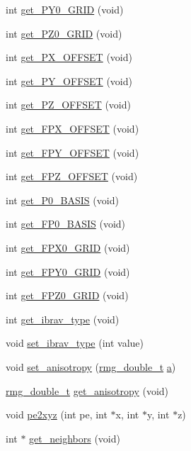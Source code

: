 \begin{DoxyCompactItemize}
\item 
int \hyperlink{class_base_grid_a1a061edfebb8264e0b182df5071f3ba0}{get\-\_\-\-P\-Y0\-\_\-\-G\-R\-I\-D} (void)
\item 
int \hyperlink{class_base_grid_a400c127433c364733a592b50bf8fff18}{get\-\_\-\-P\-Z0\-\_\-\-G\-R\-I\-D} (void)
\item 
int \hyperlink{class_base_grid_a80a0e717528a69f6df70b0fd17015931}{get\-\_\-\-P\-X\-\_\-\-O\-F\-F\-S\-E\-T} (void)
\item 
int \hyperlink{class_base_grid_a04caa97dccc0d4263602e672148eb68b}{get\-\_\-\-P\-Y\-\_\-\-O\-F\-F\-S\-E\-T} (void)
\item 
int \hyperlink{class_base_grid_a8568d735826a00f9b02247aa0ca017d2}{get\-\_\-\-P\-Z\-\_\-\-O\-F\-F\-S\-E\-T} (void)
\item 
int \hyperlink{class_base_grid_ab446df7d7fa2769a794b90cde8bb1ce3}{get\-\_\-\-F\-P\-X\-\_\-\-O\-F\-F\-S\-E\-T} (void)
\item 
int \hyperlink{class_base_grid_a6213dacd442f34373f5d9249c7ede0c1}{get\-\_\-\-F\-P\-Y\-\_\-\-O\-F\-F\-S\-E\-T} (void)
\item 
int \hyperlink{class_base_grid_a33d691755b9f99b0b7765bb9c3fe1954}{get\-\_\-\-F\-P\-Z\-\_\-\-O\-F\-F\-S\-E\-T} (void)
\item 
int \hyperlink{class_base_grid_a488fcad4a8bd19818f404c5c5cc985b6}{get\-\_\-\-P0\-\_\-\-B\-A\-S\-I\-S} (void)
\item 
int \hyperlink{class_base_grid_a7fddcf0391fe792fd6c5423e1a925c94}{get\-\_\-\-F\-P0\-\_\-\-B\-A\-S\-I\-S} (void)
\item 
int \hyperlink{class_base_grid_af2f1141d3be02ea04ea3eb982f7a6719}{get\-\_\-\-F\-P\-X0\-\_\-\-G\-R\-I\-D} (void)
\item 
int \hyperlink{class_base_grid_a712712aed5893a9d7da5a4e484224c77}{get\-\_\-\-F\-P\-Y0\-\_\-\-G\-R\-I\-D} (void)
\item 
int \hyperlink{class_base_grid_a4ed40135b1ad1e99010401eed841e0cb}{get\-\_\-\-F\-P\-Z0\-\_\-\-G\-R\-I\-D} (void)
\item 
int \hyperlink{class_base_grid_a3d04a7966015698c002bd0c901748ac3}{get\-\_\-ibrav\-\_\-type} (void)
\item 
void \hyperlink{class_base_grid_abe6a6ae80d9d773dde291b98aec1fb23}{set\-\_\-ibrav\-\_\-type} (int value)
\item 
void \hyperlink{class_base_grid_aab59bf3ad45aec3378472f5ef5b49c0c}{set\-\_\-anisotropy} (\hyperlink{rmgtypes_8h_aaa16921c14f121c56eaa42390a340db8}{rmg\-\_\-double\-\_\-t} \hyperlink{gga__xc__th_8c_abf59cc952e724dd76e644ff9480786d9}{a})
\item 
\hyperlink{rmgtypes_8h_aaa16921c14f121c56eaa42390a340db8}{rmg\-\_\-double\-\_\-t} \hyperlink{class_base_grid_a0001a8ab72f3a7d1ce92e272cf8187a7}{get\-\_\-anisotropy} (void)
\item 
void \hyperlink{class_base_grid_a26f2584b3d36b1506ee7ce698f2240e3}{pe2xyz} (int pe, int $\ast$x, int $\ast$y, int $\ast$z)
\item 
int $\ast$ \hyperlink{class_base_grid_a7841140825b40c4f126ce9bbdf2b6ef8}{get\-\_\-neighbors} (void)
\end{DoxyCompactItemize}

